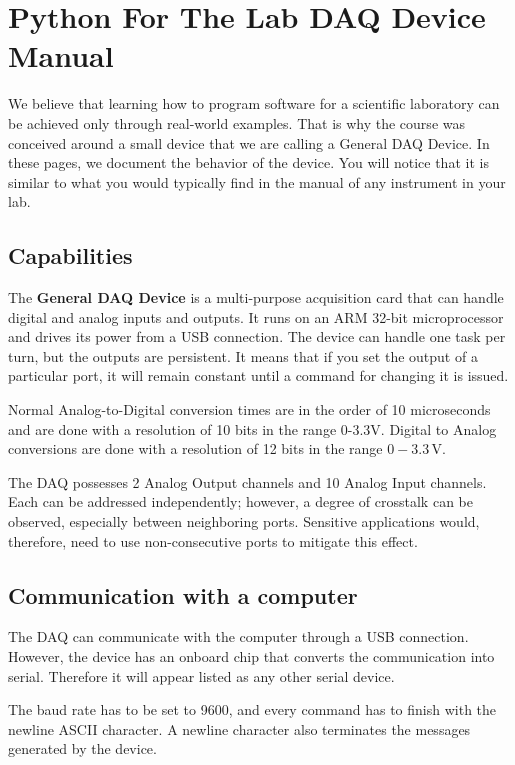 \chapter[DAQ Device Manual]{Python For The Lab {DAQ} Device Manual}\label{ch:pftl-daq-manual}
We believe that learning how to program software for a scientific laboratory can be achieved only through real-world examples. That is why the course was conceived around a small device that we are calling a General {DAQ} Device. In these pages, we document the behavior of the device. You will notice that it is similar to what you would typically find in the manual of any instrument in your lab.

\section{Capabilities}\label{sec:capabilities}
The \textbf{General {DAQ} Device} is a multi-purpose acquisition card that can handle digital and analog inputs and outputs. It runs on an {ARM} 32-bit microprocessor and drives its power from a {USB} connection. The device can handle one task per turn, but the outputs are persistent. It means that if you set the output of a particular port, it will remain constant until a command for changing it is issued.

Normal Analog-to-Digital conversion times are in the order of 10 microseconds and are done with a resolution of 10 bits in the range 0-3.3V. Digital to Analog conversions are done with a resolution of 12 bits in the range $0-3.3\,\textrm{V}$.

The {DAQ} possesses 2 Analog Output channels and 10 Analog Input channels. Each can be addressed independently; however, a degree of crosstalk can be observed, especially between neighboring ports. Sensitive applications would, therefore, need to use non-consecutive ports to mitigate this effect.

\section{Communication with a computer}\label{sec:communication-with-acomputer}
The {DAQ} can communicate with the computer through a {USB} connection. However, the device has an onboard chip that converts the communication into serial. Therefore it will appear listed as any other serial device.

The baud rate has to be set to 9600, and every command has to finish with the newline {ASCII} character. A newline character also terminates the messages generated by the device.

